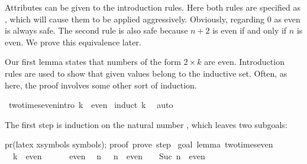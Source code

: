 \begin{isabellebody}
\begin{isamarkuptext}
Attributes can be given to the introduction rules.  Here both rules are
specified as , which will cause them to be applied aggressively.
Obviously, regarding 0 as even is always safe.  The second rule is also safe
because $n+2$ is even if and only if $n$ is even.  We prove this equivalence
later.%
\end{isamarkuptext}%
%
\begin{isamarkuptext}%
Our first lemma states that numbers of the form $2\times k$ are even.
Introduction rules are used to show that given values belong to the inductive
set.  Often, as here, the proof involves some other sort of induction.%
\end{isamarkuptext}%
\ two{\isacharunderscore}times{\isacharunderscore}even{\isacharbrackleft}intro{\isacharbang}{\isacharbrackright}{\isacharcolon}\ {\isachardoublequote}{\isacharhash}{}{\isacharasterisk}k\ {\isasymin}\ even{\isachardoublequote}\isanewline
{}\ {\isacharparenleft}induct\ {\isachardoublequote}k{\isachardoublequote}{\isacharparenright}\isanewline
\ \ auto\isanewline
{}%
\begin{isamarkuptext}%
The first step is induction on the natural number , which leaves
two subgoals:

pr(latex xsymbols symbols);
proof\ {\isacharparenleft}prove{\isacharparenright}{\isacharcolon}\ step\ {}\isanewline
\isanewline
goal\ {\isacharparenleft}lemma\ two{\isacharunderscore}times{\isacharunderscore}even{\isacharparenright}{\isacharcolon}\isanewline
{\isacharhash}{}\ {\isacharasterisk}\ k\ {\isasymin}\ even\isanewline
\ {}{\isachardot}\ {\isacharhash}{}\ {\isacharasterisk}\ {}\ {\isasymin}\ even\isanewline
\ {}{\isachardot}\ {\isasymAnd}n{\isachardot}\ {\isacharhash}{}\ {\isacharasterisk}\ n\ {\isasymin}\ even\ {\isasymLongrightarrow}\ {\isacharhash}{}\ {\isacharasterisk}\ Suc\ n\ {\isasymin}\ even


\end{isamarkuptext}
\end{isabellebody}
